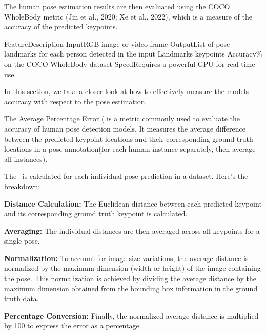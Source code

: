 The human pose estimation results are then evaluated using the COCO WholeBody metric (\scc Jin et al., 2020; \scc Xe et al., 2022), which is a measure of the accuracy of the predicted keypoints.

    \setupTABLE[r][1][style=bold]
    \setupTABLE[c][each][offset=3dd]
    \setupTABLE[frame=off]
    \setupTABLE[r][1][topframe=on,bottomframe=on]
    \setupTABLE[c][each][leftframe=on]
    \setupTABLE[c][1][leftframe=off]
    \bTR
        \bTD Feature\eTD\bTD    Description\eTD\eTR
    \bTR
        \bTD Input\eTD\bTD	    RGB image or video frame\eTD\eTR
    \bTR
        \bTD Output\eTD\bTD	    List of pose landmarks for each person detected in the input\eTD\eTR
    \bTR
        \bTD Landmarks\eTD{} keypoints\eTD\eTR
    \bTR
        \bTD Accuracy\eTD{}\% on the COCO WholeBody dataset\eTD\eTR
    \bTR
        \bTD Speed\eTD\bTD	    Requires a powerful GPU for real-time use\eTD\eTR


In this section, we take a closer look at how to effectively measure the models accuracy with respect to the pose estimation.

The Average Percentage Error (\APE\) is a metric commonly used to evaluate the accuracy of human pose detection models. It measures the average difference between the predicted keypoint locations and their corresponding ground truth locations in a pose annotation(for each human instance separately, then average all instances).

The \APE\ is calculated for each individual pose prediction in a dataset. Here's the breakdown:

\startitemize[n]
    \item {\bf Distance Calculation:} The Euclidean distance between each predicted keypoint and its corresponding ground truth keypoint is calculated.
    \item {\bf Averaging:} The individual distances are then averaged across all keypoints for a single pose.
    \item {\bf Normalization:} To account for image size variations, the average distance is normalized by the maximum dimension (width or height) of the image containing the pose. This normalization is achieved by dividing the average distance by the maximum dimension obtained from the bounding box information in the ground truth data.
    \item {\bf Percentage Conversion:} Finally, the normalized average distance is multiplied by 100 to express the error as a percentage.
\stopitemize

